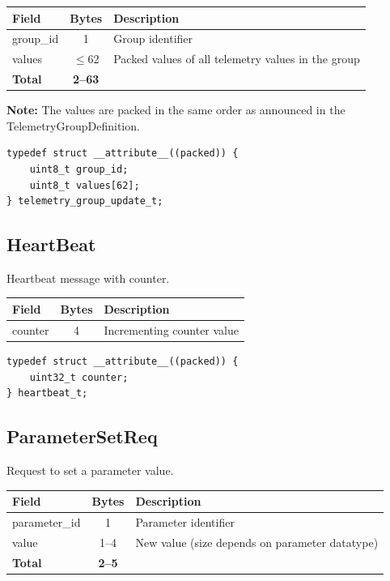 \begin{center}
\begin{tabular}{l c l}
\toprule
Field & Bytes & Description \\
\midrule
group\_id & 1 & Group identifier \\
values & $\leq$62 & Packed values of all telemetry values in the group \\
\midrule
\textbf{Total} & \textbf{2--63} & \\
\bottomrule
\end{tabular}
\end{center}

\textbf{Note:} The values are packed in the same order as announced in the TelemetryGroupDefinition.
 

\begin{lstlisting}[caption={TelemetryGroupUpdate struct}]
typedef struct __attribute__((packed)) {
    uint8_t group_id;
    uint8_t values[62];
} telemetry_group_update_t;
\end{lstlisting}

\subsection{HeartBeat}\label{struct:HeartBeat}
Heartbeat message with counter.

\begin{center}
\begin{tabular}{l c l}
\toprule
Field & Bytes & Description \\
\midrule
counter & 4 & Incrementing counter value \\
\bottomrule
\end{tabular}
\end{center}


\begin{lstlisting}[caption={HeartBeat struct}]
typedef struct __attribute__((packed)) {
    uint32_t counter;
} heartbeat_t;
\end{lstlisting}

\subsection{ParameterSetReq}\label{struct:ParameterSetReq}
Request to set a parameter value.

\begin{center}
\begin{tabular}{l c l}
\toprule
Field & Bytes & Description \\
\midrule
parameter\_id & 1 & Parameter identifier \\
value & 1--4 & New value (size depends on parameter datatype) \\
\midrule
\textbf{Total} & \textbf{2--5} & \\
\bottomrule
\end{tabular}
\end{center}

